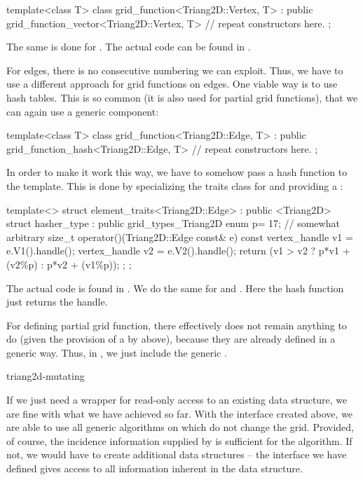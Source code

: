 \begin{example}
template<class T>
class grid_function<Triang2D::Vertex, T>
 : public grid_function_vector<Triang2D::Vertex, T> 
{
 // repeat constructors here.
};
\end{example}
The same is done for .
The actual code can be found in 
.

For edges, there is no consecutive numbering we can exploit.
Thus, we have to use a different approach for grid functions
on edges. One viable way is to use hash tables. 
This is so common (it is also used for partial grid functions),
that we can again use a generic component:
\begin{example}
template<class T>
class grid_function<Triang2D::Edge, T> 
  : public grid_function_hash<Triang2D::Edge, T> 
{
  // repeat constructors here.
};
\end{example}
In order to make it work this way, we have to somehow
pass a hash function to the 
template. This is done by specializing the traits class
 for 
and providing a :
\begin{example}
template<>
struct element_traits<Triang2D::Edge> 
  : public <Triang2D> 
{
  struct hasher_type : public grid_types_Triang2D {
    enum { p= 17}; // somewhat arbitrary
    size_t operator()(Triang2D::Edge const& e) const { 
      vertex_handle v1 = e.V1().handle();
      vertex_handle v2 = e.V2().handle();
      return (v1 > v2 ? p*v1 + (v2\%p) : p*v2 + (v1\%p));
    }
  };
};
\end{example}
The actual code is found in 
.
We do the same for  and .
Here the hash function just returns the handle.

For defining partial grid function, there effectively does not remain
anything to do (given the provision of a  by
 above), because they are already defined in a generic
way. Thus, in ,
we just include the generic .

\begin{Label}{triang2d-mutating}
\end{Label}

If we just need a wrapper for read-only access to an existing
data structure, we are fine with what we have achieved so far.
With the interface created above, we are able to use all generic
algorithms on  which do not change the grid.
Provided, of course, the incidence information supplied by 
 is sufficient for the algorithm.
If not, we would have to create additional data structures
-- the interface we have defined gives access to all information
inherent in the data structure.

